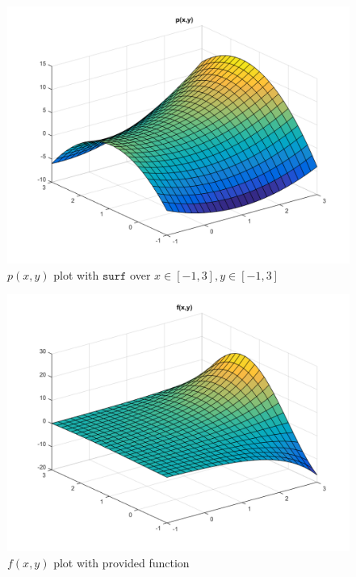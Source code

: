 \documentclass[14pt,a4paper]{article}
\begin{document}
\begin{enumerate}
		\begin{figure}[htp]
			\begin{center}
				\includegraphics[scale=0.6]{p_xy.png}
				\caption{$p(x,y)$ plot with $\mathtt{surf}$ over $x \in [-1,3], y\in [-1,3]$}
			\end{center}
		\end{figure}
		\pagebreak
		\begin{figure}[htp]
			\begin{center}
				\includegraphics[scale=0.6]{f_xy.png}
				\caption{$f(x,y)$ plot with provided function}
			\end{center}
		\end{figure}
		
		 
	\end{enumerate}	 
\end{document}
